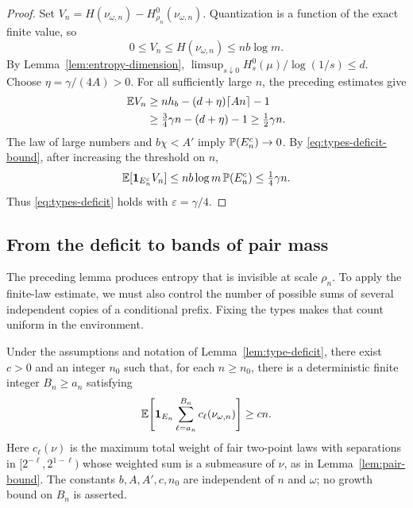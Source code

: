 \begin{proof}
Set
$V_n=H(\nu_{\omega,n})-H_{\rho_n}^0(\nu_{\omega,n})$.
Quantization is a function of the exact finite value, so
\begin{equation}\label{eq:types-deficit-bound}
 0\le V_n\le H(\nu_{\omega,n})\le nb\log m.
\end{equation}
By Lemma~\ref{lem:entropy-dimension},
$\limsup_{s\downarrow0}H_s^0(\mu)/\log(1/s)\le d$.
Choose $\eta=\gamma/(4A)>0$.
For all sufficiently large $n$, the preceding estimates give
\begin{align*}
 \E V_n
 &\ge nh_b-(d+\eta)\lceil An\rceil-1\\
 &\ge\tfrac34\gamma n-(d+\eta)-1
 \ge\tfrac12\gamma n.
\end{align*}
The law of large numbers and $b\chi<A'$ imply $\P(E_n^c)\to0$.
By \eqref{eq:types-deficit-bound}, after increasing the threshold on $n$,
\[
 \E[\mathbf1_{E_n^c}V_n]
 \le nb\log m\,\P(E_n^c)\le\tfrac14\gamma n.
\]
Thus \eqref{eq:types-deficit} holds with $\varepsilon=\gamma/4$.
\end{proof}

\subsection{From the deficit to bands of pair mass}

The preceding lemma produces entropy that is invisible at scale
$\rho_n$.  To apply the finite-law estimate, we must also control the
number of possible sums of several independent copies of a conditional
prefix.  Fixing the types makes that count uniform in the environment.

\begin{proposition}\label{prop:pair-bands}
Under the assumptions and notation of Lemma~\ref{lem:type-deficit},
there exist $c>0$ and an integer $n_0$ such that, for each $n\ge n_0$,
there is a deterministic finite integer $B_n\ge a_n$ satisfying
\begin{equation}\label{eq:types-pair-bands}
 \E\!\left[\mathbf1_{E_n}
       \sum_{\ell=a_n}^{B_n}c_\ell(\nu_{\omega,n})\right]\ge cn.
\end{equation}
Here $c_\ell(\nu)$ is the maximum total weight of fair two-point laws
with separations in $[2^{-\ell},2^{1-\ell})$ whose weighted sum is a
submeasure of $\nu$, as in Lemma~\ref{lem:pair-bound}.
The constants $b,A,A',c,n_0$ are independent of $n$ and $\omega$;
no growth bound on $B_n$ is asserted.
\end{proposition}

